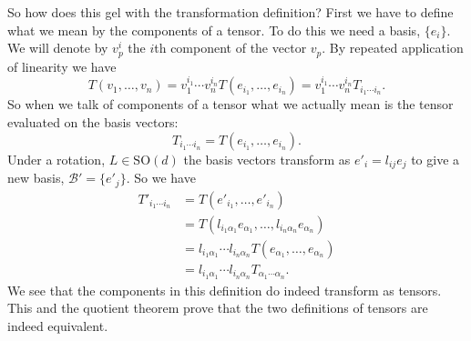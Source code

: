 \documentclass[a4paper]{article}
\newcommand{\specialOrthogonalGroup}{\mathrm{SO}}
\newcommand{\basis}{\mathcal{B}}
\begin{document}
    So how does this gel with the transformation definition?
    First we have to define what we mean by the components of a tensor.
    To do this we need a basis, \(\{e_i\}\).
    We will denote by \(v^{i}_p\) the \(i\)th component of the vector \(v_p\).
    By repeated application of linearity we have
    \[T(v_1, \dotsc, v_n) = v_1^{i_1}\dotsm v_n^{i_n}T(e_{i_1}, \dotsc, e_{i_n}) = v_1^{i_1}\dotsm v_n^{i_n}T_{i_1\dotsm i_n}.\]
    So when we talk of components of a tensor what we actually mean is the tensor evaluated on the basis vectors:
    \[T_{i_1\dotsm i_n} = T(e_{i_1}, \dotsc, e_{i_n}).\]
    Under a rotation, \(L\in\specialOrthogonalGroup(d)\) the basis vectors transform as \(e'_i = l_{ij}e_{j}\) to give a new basis, \(\basis' = \{e'_j\}\).
    So we have
    \begin{align*}
        T'_{i_1\dotsm i_n} &= T(e'_{i_1}, \dotsc, e'_{i_n})\\
        &= T(l_{i_1\alpha_1}e_{\alpha_1}, \dotsc, l_{i_n\alpha_n}e_{\alpha_n})\\
        &= l_{i_1\alpha_1}\dotsm l_{i_n\alpha_n}T(e_{\alpha_1}, \dotsc, e_{\alpha_n})\\
        &= l_{i_1\alpha_1}\dotsm l_{i_n\alpha_n} T_{\alpha_1\dotsm\alpha_n}.
    \end{align*}
    We see that the components in this definition do indeed transform as tensors.
    This and the quotient theorem prove that the two definitions of tensors are indeed equivalent.
    
\end{document}
